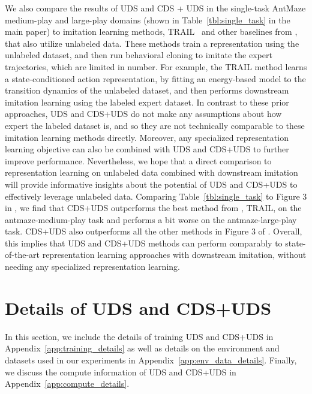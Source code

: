 We also compare the results of UDS and CDS + UDS in the single-task AntMaze medium-play and large-play domains (shown in  Table~\ref{tbl:single_task} in the main paper) to imitation learning methods, TRAIL~\citep{yang2021trail} and other baselines from \citet{yang2021trail}, that also utilize unlabeled data. These methods train a representation using the unlabeled dataset, and then run behavioral cloning to imitate the expert trajectories, which are limited in number. For example, the TRAIL method learns a state-conditioned action representation, by fitting an energy-based model to the transition dynamics of the unlabeled dataset, and then performs downstream imitation learning using the labeled expert dataset. In contrast to these prior approaches, UDS and CDS+UDS do not make any assumptions about how expert the labeled dataset is, and so they are not technically comparable to these imitation learning methods directly. Moreover, any specialized representation learning objective can also be combined with UDS and CDS+UDS to further improve performance. Nevertheless, we hope that a direct comparison to representation learning on unlabeled data combined with downstream imitation will provide informative insights about the potential of UDS and CDS+UDS to effectively leverage unlabeled data. Comparing Table~\ref{tbl:single_task} to Figure 3 in \citet{yang2021trail}, we find that CDS+UDS outperforms the best method from \citet{yang2021trail}, TRAIL, on the antmaze-medium-play task and performs a bit worse on the antmaze-large-play task. CDS+UDS also outperforms all the other methods in Figure 3 of \cite{yang2021trail}. Overall, this implies that UDS and CDS+UDS methods can perform comparably to state-of-the-art representation learning approaches with downstream imitation, without needing any specialized representation learning.

\section{Details of UDS and CDS+UDS}
\label{app:details}

In this section, we include the details of training UDS and CDS+UDS in  Appendix~\ref{app:training_details} as well as details on the environment and datasets used in our experiments in Appendix~\ref{app:env_data_details}. Finally, we discuss the compute information of UDS and CDS+UDS in Appendix~\ref{app:compute_details}.

